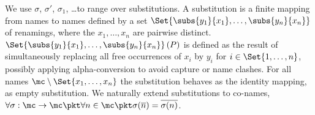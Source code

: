 \documentclass[final,copyright,creativecommons]{eptcs}
\begin{document}
We use $ \sigma $, $ \sigma' $, $ \sigma_1 $, \ldots to range over substitutions. A substitution is a finite mapping from names to names defined by a set $ \Set{ \subs{y_1}{x_1}, \ldots, \subs{y_n}{x_n} } $ of renamings, where the $ x_1, \ldots, x_n $ are pairwise distinct.
$ \Set{ \subs{y_1}{x_1}, \ldots, \subs{y_n}{x_n} }\left( P \right) $ is defined as the result of simultaneously replacing all free occurrences of $ x_i $ by $ y_i $ for $ i \in \Set{ 1, \ldots, n } $, possibly applying alpha-conversion to avoid capture or name clashes. For all names $ \mc \setminus \Set{ x_1, \ldots, x_n } $ the substitution behaves as the identity mapping, \ie as empty substitution.
We naturally extend substitutions to co-names, \ie $ \forall \sigma : \mc \to \mc \pkt \forall n \in \mc \pkt \sigma\!\left( \overline{n} \right) = \overline{\sigma\!\left( n \right)} $.
\end{document}
